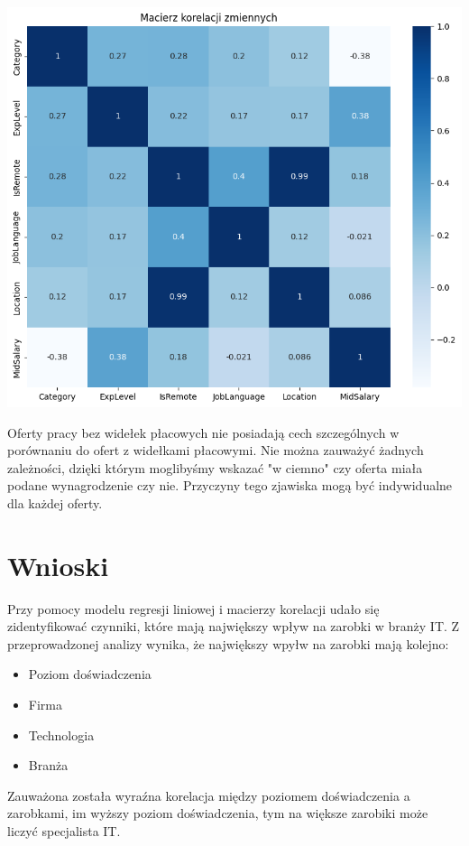\documentclass{article}
\begin{document}
\begin{center}
    \includegraphics[scale=0.5]{img/corr_matrix_zero_salary.png}
\end{center}

Oferty pracy bez widełek płacowych nie posiadają cech szczególnych w porównaniu do ofert z widełkami płacowymi.
Nie można zauważyć żadnych zależności, dzięki którym moglibyśmy wskazać "w ciemno" czy oferta miała podane wynagrodzenie czy nie.
Przyczyny tego zjawiska mogą być indywidualne dla każdej oferty.

\pagebreak

\section{Wnioski}

Przy pomocy modelu regresji liniowej i macierzy korelacji udało się zidentyfikować czynniki,
które mają największy wpływ na zarobki w branży IT.
Z przeprowadzonej analizy wynika, że największy wpyłw na zarobki mają kolejno:
\begin{itemize}
    \item Poziom doświadczenia
    \item Firma
    \item Technologia
    \item Branża
\end{itemize}

Zauważona została wyraźna korelacja między poziomem doświadczenia a zarobkami, im wyższy poziom doświadczenia,
tym na większe zarobiki może liczyć specjalista IT.
\end{document}
